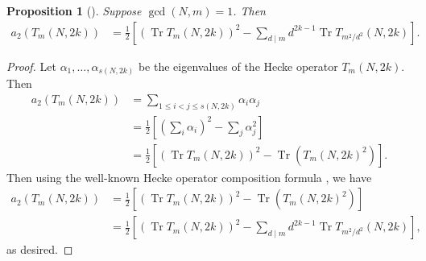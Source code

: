 \documentclass[11pt,letterpaper,reqno]{amsart}
\numberwithin{figure}{section}
\numberwithin{table}{section}
\theoremstyle{definition}
\theoremstyle{plain}
\newtheorem{proposition}[theorem]{Proposition}
\theoremstyle{definition}
\theoremstyle{definition}
\theoremstyle{remark}
\numberwithin{equation}{section}
\DeclareMathOperator{\Tr}{Tr}
\begin{document}
\begin{proposition}[{\cite[Proposition 2.1]{previousPaper}}]  \label{prop:a2-formula}
Suppose $\gcd(N,m)=1$. Then    
\begin{align}\label{eq:step1}
        a_2(T_m(N,2k)) 
        &= \frac{1}{2}\left[(\Tr T_m(N,2k))^2- \sum_{d\mid m} d^{2k-1} \Tr T_{m^2/d^2}(N,2k) \right].
   \end{align}
\end{proposition}
\begin{proof}
  Let $\alpha_1, \dots, \alpha_{s(N,2k)}$ be the eigenvalues of the Hecke operator $T_m(N, 2k)$.   Then
   \begin{align}
        a_2(T_m(N,2k)) &= \sum_{1\leq i<j\leq s(N,2k)}\alpha_i\alpha_j \\
        &= \frac{1}{2}\left[ \left( \sum_i \alpha_i\right)^2-\sum_{j}\alpha_j^2 \right] \\
        &=\frac{1}{2}\left[(\Tr T_m(N,2k))^2-\Tr (T_m(N,2k)^2)\right].
   \end{align}
   Then using the well-known Hecke operator composition formula \cite[Theorem~10.2.9]{cohen-stromberg}, we have
    \begin{align}
        a_2(T_m(N,2k)) &= \frac{1}{2}\left[(\Tr T_m(N,2k))^2-\Tr (T_m(N,2k)^2)\right] \\
        &= \frac{1}{2}\left[(\Tr T_m(N,2k))^2- \sum_{d\mid m} d^{2k-1} \Tr T_{m^2/d^2}(N,2k) \right],
   \end{align}
   as desired.
\end{proof}

\end{document}
